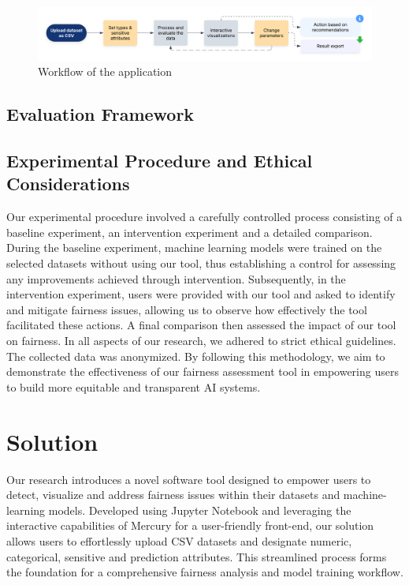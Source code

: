 \documentclass[runningheads]{llncs}
\begin{document}
\begin{figure}
\includegraphics[width=\textwidth]{images/workflow.png}
\caption{Workflow of the application} \label{workflow}
\end{figure}

\subsection{Evaluation Framework}

\subsection{Experimental Procedure and Ethical Considerations}
Our experimental procedure involved a carefully controlled process consisting of a baseline experiment, an intervention experiment and a detailed comparison. During the baseline experiment, machine learning models were trained on the selected datasets without using our tool, thus establishing a control for assessing any improvements achieved through intervention. Subsequently, in the intervention experiment, users were provided with our tool and asked to identify and mitigate fairness issues, allowing us to observe how effectively the tool facilitated these actions. A final comparison then assessed the impact of our tool on fairness. In all aspects of our research, we adhered to strict ethical guidelines. The collected data was anonymized. By following this methodology, we aim to demonstrate the effectiveness of our fairness assessment tool in empowering users to build more equitable and transparent AI systems.

\section{Solution}
Our research introduces a novel software tool designed to empower users to detect, visualize and address fairness issues within their datasets and machine-learning models. Developed using Jupyter Notebook and leveraging the interactive capabilities of Mercury for a user-friendly front-end, our solution allows users to effortlessly upload CSV datasets and designate numeric, categorical, sensitive and prediction attributes. This streamlined process forms the foundation for a comprehensive fairness analysis and model training workflow.\\
\end{document}

